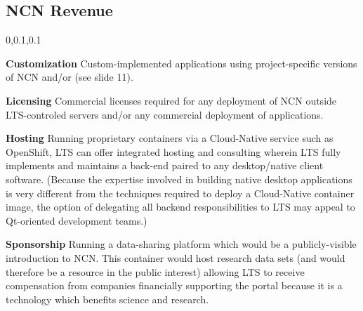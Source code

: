 
\begin{frame}{}
\section{NCN Revenue}
\vspace{-.5em}	

{\selectfont
\hspace*{-20pt}\begin{minipage}{1.1\textwidth}
\vspace{4pt}


		
\begin{lightquadblockc}{0,0.1,0.1}{}
\begin{center}\begin{minipage}{1.05\textwidth}
{\fontsize{16}{23}\selectfont \setlength{\leftmargini}{30pt}\begin{enumerate}
\dmitem \textbf{Customization} \hspace{.5em} Custom-implemented applications 
using project-specific versions of NCN and/or \AtR{} 
(see slide 11).\vspace{10pt}

\dmitem \textbf{Licensing}  \hspace{.5em} Commercial licenses required for 
any deployment of NCN outside LTS-controled 
servers and/or any commercial deployment of \AtR{} 
applications.\vspace{10pt}

\dmitem \textbf{Hosting}  \hspace{.5em} Running proprietary 
containers via a Cloud-Native service such as 
OpenShift, LTS can offer integrated hosting and consulting 
wherein LTS fully implements and maintains a back-end 
paired to any desktop/native client software.
(Because the expertise involved 
in building native desktop applications is very different 
from the techniques required to deploy a Cloud-Native container 
image, the option of delegating all 
backend responsibilities to LTS may 
appeal to Qt-oriented development teams.)\vspace{10pt}

\dmitem \textbf{Sponsorship}  \hspace{.5em} 
Running a data-sharing platform which would be a 
publicly-visible introduction to NCN.  
This  container 
would host research data sets (and 
would therefore be a resource in the public 
interest) allowing LTS to receive compensation 
from companies financially supporting the 
portal because it is a technology which
benefits science and research.
\end{enumerate}
}\end{minipage}
\end{center}
\end{lightquadblockc}
\end{minipage}

}

\end{frame}
